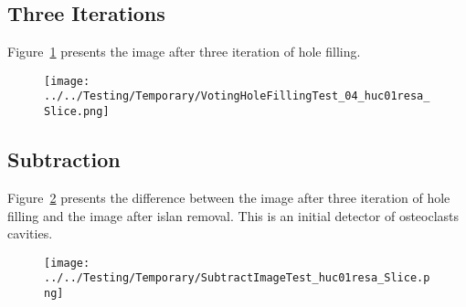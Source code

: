 \documentclass{InsightArticle}
\begin{document}
\subsection{Three Iterations}

Figure~\ref{fig:HoleFillingIteration03Image} presents the image after three iteration of hole filling.

\begin{figure}
\center
\texttt{[image: ../../Testing/Temporary/VotingHoleFillingTest\_04\_huc01resa\_Slice.png]}
\label{fig:HoleFillingIteration03Image}
\end{figure}



\subsection{Subtraction}

Figure~\ref{fig:SubtractionImage} presents the difference between the image
after three iteration of hole filling and the image after islan removal. This
is an initial detector of osteoclasts cavities.

\begin{figure}
\center
\texttt{[image: ../../Testing/Temporary/SubtractImageTest\_huc01resa\_Slice.png]}
\label{fig:SubtractionImage}
\end{figure}




%
%



\end{document}
